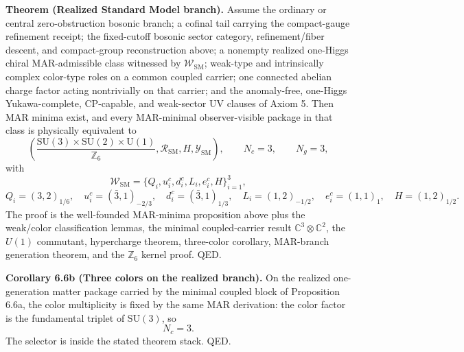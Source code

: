 \textbf{Theorem (Realized Standard Model branch).} Assume the ordinary or central zero-obstruction
bosonic branch; a cofinal tail carrying the compact-gauge refinement receipt; the fixed-cutoff bosonic sector category, refinement/fiber descent, and
compact-group reconstruction above; a nonempty realized one-Higgs chiral MAR-admissible class
witnessed by \(\mathcal W_{\mathrm{SM}}\); weak-type and intrinsically complex color-type roles
on a common coupled carrier; one connected abelian charge factor acting nontrivially on that
carrier; and the anomaly-free, one-Higgs Yukawa-complete, CP-capable, and weak-sector UV clauses
of Axiom 5. Then MAR minima exist, and every MAR-minimal observer-visible package in that class is
physically equivalent to
\[
\left(
\frac{\mathrm{SU}(3)\times\mathrm{SU}(2)\times\mathrm U(1)}{\mathbb Z_6},
\mathcal R_{\mathrm{SM}},
H,
\mathcal Y_{\mathrm{SM}}
\right),
\qquad
N_c=3,\qquad N_g=3,
\]
with
\[
\mathcal W_{\mathrm{SM}}
=
\{Q_i,u_i^c,d_i^c,L_i,e_i^c,H\}_{i=1}^{3},
\]
\[
Q_i=(3,2)_{1/6},\quad
u_i^c=(\bar 3,1)_{-2/3},\quad
d_i^c=(\bar 3,1)_{1/3},\quad
L_i=(1,2)_{-1/2},\quad
e_i^c=(1,1)_1,\quad
H=(1,2)_{1/2}.
\]
The proof is the well-founded MAR-minima proposition above plus the weak/color classification
lemmas, the minimal coupled-carrier result \(\mathbb C^3\otimes\mathbb C^2\), the \(U(1)\)
commutant, hypercharge theorem, three-color corollary, MAR-branch generation theorem, and the
\(\mathbb Z_6\) kernel proof. QED.

\textbf{Corollary 6.6b (Three colors on the realized branch).} On the realized one-generation matter package carried by the minimal coupled block of Proposition 6.6a, the color multiplicity is fixed by the same MAR derivation: the color factor is the fundamental triplet of \(\mathrm{SU}(3)\), so
\[
N_c=3.
\]
The selector is inside the stated theorem stack. QED.

